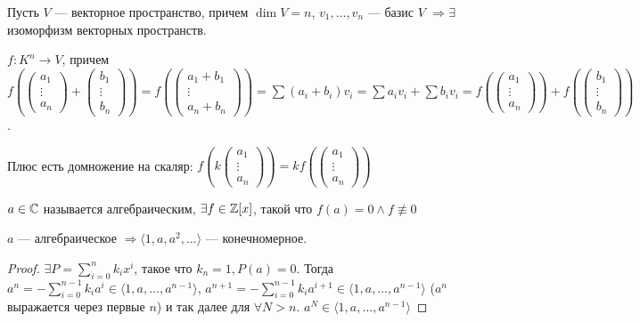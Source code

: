 \begin{remark}[Напоминание]
    Пусть $V$ --- векторное пространство, причем  $\dim V = n$,  $v_1, \ldots, v_n$ --- базис $V$  $\Rightarrow \exists$ изоморфизм векторных пространств.

    $f\!: K^n \to V$, причем  $f(\begin{pmatrix} a_1 \\ \vdots \\ a_n \end{pmatrix} + \begin{pmatrix} b_1 \\ \vdots \\ b_n \end{pmatrix}) = f(\begin{pmatrix} a_1 + b_1 \\ \vdots \\ a_n + b_n \end{pmatrix}) = \sum (a_i + b_i) v_i = \sum a_iv_i + \sum b_iv_i = f(\begin{pmatrix} a_1 \\ \vdots \\ a_n \end{pmatrix}) + f(\begin{pmatrix} b_1 \\ \vdots \\ b_n \end{pmatrix})$.

    Плюс есть домножение на скаляр: $f(k\begin{pmatrix} a_1 \\ \vdots \\ a_n \end{pmatrix}) = kf(\begin{pmatrix} a_1 \\ \vdots \\ a_n \end{pmatrix})$
\end{remark}
\begin{definition}
    $a \in \mathbb{C}$ называется алгебраическим,  $\exists f \in \mathbb{Z}[x]$, такой что  $f(a) = 0 \land f \not\equiv 0$
\end{definition}
 \begin{statement}
     $a$ --- алгебраическое  $\Rightarrow \langle 1, a, a^2, \ldots \rangle$ --- конечномерное. 
\end{statement}
\begin{proof}
    $\exists P = \sum\limits_{i=0}^n k_i x^i$, такое что  $k_n = 1, P(a) = 0$. Тогда $a^n = -\sum\limits_{i=0}^{n-1} k_i a^i \in \langle 1, a, \ldots, a^{n-1} \rangle$, $a^{n+1} = -\sum\limits_{i=0}^{n-1} k_i a^{i+1} \in \langle 1, a, \ldots, a^{n-1} \rangle$  ($a^n$ выражается через первые $n$)  и так далее для  $\forall N > n$.  $a^N \in \langle 1, a,\ldots, a^{n-1} \rangle$
\end{proof}
